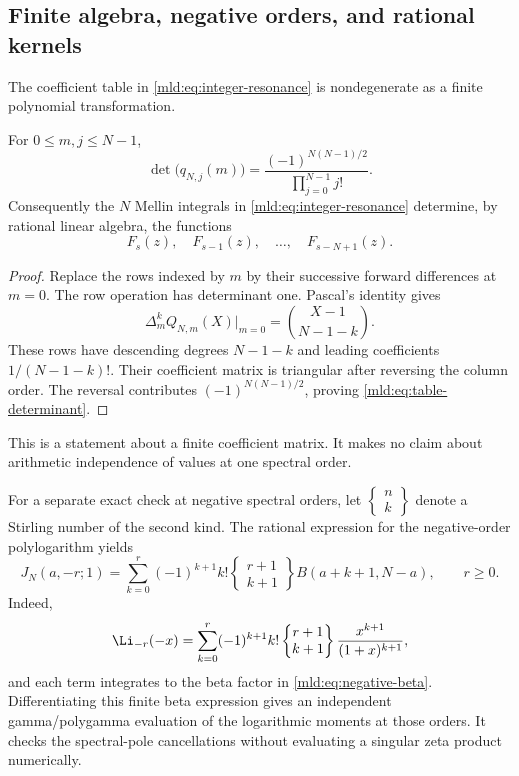 \subsection{Finite algebra, negative orders, and rational kernels}

The coefficient table in \eqref{mld:eq:integer-resonance} is nondegenerate as a finite polynomial transformation.
\begin{proposition}\label{mld:prop:table-invertible}
For $0\le m,j\le N-1$,
\begin{equation}\label{mld:eq:table-determinant}
 \det\big(q_{N,j}(m)\big)
       =\frac{(-1)^{N(N-1)/2}}{\prod_{j=0}^{N-1}j!}.
\end{equation}
Consequently the $N$ Mellin integrals in \eqref{mld:eq:integer-resonance}
determine, by rational linear algebra, the functions
\[
 F_s(z),\quad F_{s-1}(z),\quad\ldots,\quad F_{s-N+1}(z).
\]
\end{proposition}
\begin{proof}
Replace the rows indexed by $m$ by their successive forward differences at $m=0$. The row operation has determinant one. Pascal's identity gives
\[
 \Delta_m^k Q_{N,m}(X)\big|_{m=0}
       =\binom{X-1}{N-1-k}.
\]
These rows have descending degrees $N-1-k$ and leading coefficients $1/(N-1-k)!$. Their coefficient matrix is triangular after reversing the column order. The reversal contributes $(-1)^{N(N-1)/2}$, proving \eqref{mld:eq:table-determinant}.
\end{proof}
This is a statement about a finite coefficient matrix. It makes no claim about arithmetic independence of values at one spectral order.

For a separate exact check at negative spectral orders, let $\left\{\begin{smallmatrix}n\\k\end{smallmatrix}\right\}$ denote a Stirling number of the second kind. The rational expression for the negative-order polylogarithm yields
\begin{equation}\label{mld:eq:negative-beta}
 J_N(a,-r;1)=\sum_{k=0}^{r}(-1)^{k+1}k!
   \left\{\begin{matrix}r+1\\k+1\end{matrix}\right\}
                     B(a+k+1,N-a),\qquad r\ge0.
\end{equation}
Indeed,
\[
 \Li_{-r}(-x)=\sum_{k=0}^{r}(-1)^{k+1}k!
   \left\{\begin{matrix}r+1\\k+1\end{matrix}\right\}
                  \frac{x^{k+1}}{(1+x)^{k+1}},
\]
and each term integrates to the beta factor in \eqref{mld:eq:negative-beta}. Differentiating this finite beta expression gives an independent gamma/polygamma evaluation of the logarithmic moments at those orders. It checks the spectral-pole cancellations without evaluating a singular zeta product numerically.


